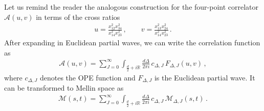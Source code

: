 Let us remind the reader the analogous construction \cite{Costa:2012cb} for the four-point correlator $ \mathcal{A}( u,v ) $ in terms of the cross ratios
\begin{align}
  u =  \frac{x_{12}^2 x_{34}^2 }{x_{14}^2 x_{23}^2 } \,, \qquad v = \frac{x_{13}^2 x_{24}^2 }{x_{14}^2 x_{23}^2}\,.
\end{align}
After expanding in Euclidean partial waves, we can write the correlation function as
\begin{align}
  \mathcal{A}( u,v)
  =
  \displaystyle\sum_{J=0}^{\infty}
  \displaystyle\int_{\frac{d}{2}+i \mathbb{R}}
  \frac{d\Delta}{2\pi i}\,
  c_{\Delta,J}\,
  F_{\Delta,J} ( u,v )
  \,,
  \label{eq:EuclideanInversion}
\end{align}
where $ c_{\Delta,J} $ denotes the OPE function and $ F_{\Delta,J} $ is the Euclidean partial wave.
It can be transformed to Mellin space as
\begin{align}
  \mathcal{M}(s,t)
  =
  \displaystyle\sum_{J=0}^{\infty}
  \int_{\frac{d}{2}+i \mathbb{R}}
  \frac{d\Delta}{2\pi i}\,
  c_{\Delta,J}\,
  \mathcal{M}_{\Delta,J} (s,t)
  \,.
  \label{eq:MellinInversion}
\end{align}
